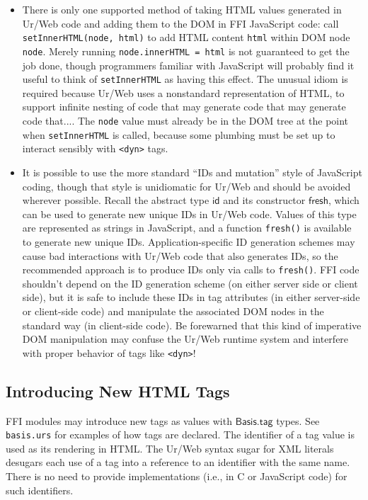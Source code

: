 \documentclass{article}
\newcommand{\cd}[1]{\texttt{#1}}
\newcommand{\mt}[1]{\mathsf{#1}}
\begin{document}
\begin{itemize}
\item There is only one supported method of taking HTML values generated in Ur/Web code and adding them to the DOM in FFI JavaScript code: call \cd{setInnerHTML(node, html)} to add HTML content \cd{html} within DOM node \cd{node}.  Merely running \cd{node.innerHTML = html} is not guaranteed to get the job done, though programmers familiar with JavaScript will probably find it useful to think of \cd{setInnerHTML} as having this effect.  The unusual idiom is required because Ur/Web uses a nonstandard representation of HTML, to support infinite nesting of code that may generate code that may generate code that....  The \cd{node} value must already be in the DOM tree at the point when \cd{setInnerHTML} is called, because some plumbing must be set up to interact sensibly with \cd{<dyn>} tags. 

\item It is possible to use the more standard ``IDs and mutation'' style of JavaScript coding, though that style is unidiomatic for Ur/Web and should be avoided wherever possible.  Recall the abstract type $\mt{id}$ and its constructor $\mt{fresh}$, which can be used to generate new unique IDs in Ur/Web code.  Values of this type are represented as strings in JavaScript, and a function \cd{fresh()} is available to generate new unique IDs.  Application-specific ID generation schemes may cause bad interactions with Ur/Web code that also generates IDs, so the recommended approach is to produce IDs only via calls to \cd{fresh()}.  FFI code shouldn't depend on the ID generation scheme (on either server side or client side), but it is safe to include these IDs in tag attributes (in either server-side or client-side code) and manipulate the associated DOM nodes in the standard way (in client-side code).  Be forewarned that this kind of imperative DOM manipulation may confuse the Ur/Web runtime system and interfere with proper behavior of tags like \cd{<dyn>}!
\end{itemize}

\subsection{Introducing New HTML Tags}

FFI modules may introduce new tags as values with $\mt{Basis.tag}$ types.  See \texttt{basis.urs} for examples of how tags are declared.  The identifier of a tag value is used as its rendering in HTML.  The Ur/Web syntax sugar for XML literals desugars each use of a tag into a reference to an identifier with the same name.  There is no need to provide implementations (i.e., in C or JavaScript code) for such identifiers.
\end{document}
